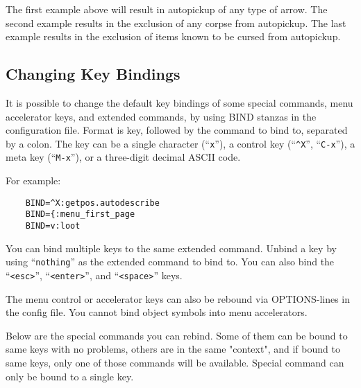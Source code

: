 The first example above will result in autopickup of any type of arrow.
The second example results in the exclusion of any corpse from autopickup.
The last example results in the exclusion of items known to be cursed from
autopickup.


\subsection*{Changing Key Bindings}

It is possible to change the default key bindings of some special commands,
menu accelerator keys, and extended commands, by using BIND stanzas in the
configuration file. Format is key, followed by the command to bind to, separated
by a colon. The key can be a single character (``{\tt x}''),
a control key (``{\tt \^{}X}'', ``{\tt C-x}''), a meta key (``{\tt M-x}''),
or a three-digit decimal ASCII code.

For example:

\begin{verbatim}
    BIND=^X:getpos.autodescribe
    BIND={:menu_first_page
    BIND=v:loot
\end{verbatim}

\blist{}
\item[\tb{Extended command keys}]
You can bind multiple keys to the same extended command. Unbind a key by
using ``{\tt nothing}'' as the extended command to bind to. You can also bind
the ``{\tt <esc>}'', ``{\tt <enter>}'', and ``{\tt <space>}'' keys.

\item[\tb{Menu accelerator keys}]
The menu control or accelerator keys can also be rebound via OPTIONS-lines
in the config file. You cannot bind object symbols into menu accelerators.

\item[\tb{Special command keys}]
Below are the special commands you can rebind. Some of them can be bound to
same keys with no problems, others are in the same "context", and if bound
to same keys, only one of those commands will be available. Special command
can only be bound to a single key.

